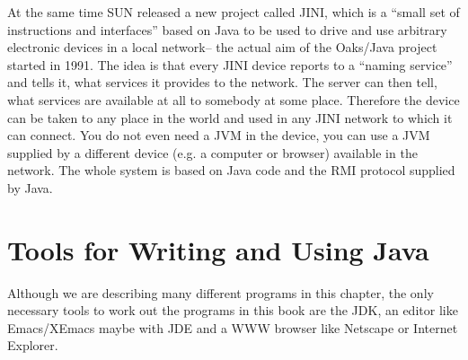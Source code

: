 At the same time SUN released a new project called JINI, which is
a ``small set of instructions and interfaces'' based on Java to
be used to drive and use arbitrary electronic devices in a local network--
the actual aim of the Oaks/Java project started in 1991. The idea is that every 
JINI device reports to a ``naming service'' and tells it, what services
it provides to the network. The server can then tell, what services are
available at all to somebody at some place. Therefore the device can be 
taken to any place in the world and used in any JINI network to which
it can connect. You do not even need a JVM in the device, you can 
use a JVM supplied by a different device (e.g. a computer or browser) 
available in the network. The whole system is based on Java code and
the RMI protocol supplied by Java.


\section{Tools for Writing and Using Java}

Although we are describing many different programs in this chapter, the only 
necessary tools to work out the programs in this book are the JDK, an editor
like Emacs/XEmacs maybe with JDE and a WWW browser like Netscape or
Internet Explorer. 

